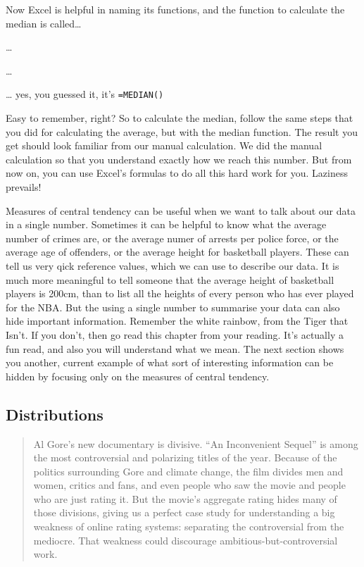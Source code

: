 \documentclass[
]{book}
\begin{document}
Now Excel is helpful in naming its functions, and the function to calculate the median is called\ldots{}

\ldots{}

\ldots{}

\ldots{} yes, you guessed it, it's \texttt{=MEDIAN()}

Easy to remember, right? So to calculate the median, follow the same steps that you did for calculating the average, but with the median function. The result you get should look familiar from our manual calculation. We did the manual calculation so that you understand exactly how we reach this number. But from now on, you can use Excel's formulas to do all this hard work for you. Laziness prevails!

Measures of central tendency can be useful when we want to talk about our data in a single number. Sometimes it can be helpful to know what the average number of crimes are, or the average numer of arrests per police force, or the average age of offenders, or the average height for basketball players. These can tell us very qick reference values, which we can use to describe our data. It is much more meaningful to tell someone that the average height of basketball players is 200cm, than to list all the heights of every person who has ever played for the NBA. But the using a single number to summarise your data can also hide important information. Remember the white rainbow, from the Tiger that Isn't. If you don't, then go read this chapter from your reading. It's actually a fun read, and also you will understand what we mean. The next section shows you another, current example of what sort of interesting information can be hidden by focusing only on the measures of central tendency.

\hypertarget{distributions}{%
\subsection{Distributions}\label{distributions}}

\begin{quote}
Al Gore's new documentary is divisive. ``An Inconvenient Sequel'' is among the most controversial and polarizing titles of the year. Because of the politics surrounding Gore and climate change, the film divides men and women, critics and fans, and even people who saw the movie and people who are just rating it. But the movie's aggregate rating hides many of those divisions, giving us a perfect case study for understanding a big weakness of online rating systems: separating the controversial from the mediocre. That weakness could discourage ambitious-but-controversial work.
\end{quote}
\end{document}
